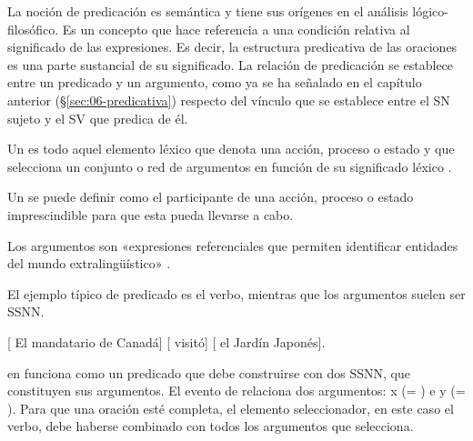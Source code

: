 La noción de predicación es semántica y tiene sus orígenes en el análisis
lógico-filosófico. Es un concepto que hace referencia a una condición relativa
al significado de las expresiones. Es decir, la estructura predicativa de las
oraciones es una parte sustancial de su significado. La relación de predicación
se establece entre un predicado y un argumento, como ya se ha señalado en el
capítulo anterior (§\ref{sec:06-predicativa}) respecto del vínculo que se
establece entre el SN sujeto y el SV que predica de él.

\begin{destacado}
Un  es todo aquel elemento léxico que denota una acción,
proceso o estado y que selecciona un conjunto o red de argumentos en función de
su significado léxico \parencite{rodriguezramalle2005}.
\end{destacado}

Un  se puede definir como el participante de una acción,
proceso o estado imprescindible para que esta pueda llevarse a cabo.

\begin{destacado}
Los argumentos son «expresiones referenciales que permiten identificar entidades
del mundo extralingüístico» \parencite[102]{ditullio2014}.
\end{destacado}

El ejemplo típico de predicado es el verbo, mientras que los argumentos suelen
ser SSNN.

\begin{exe}
  \ex\label{ex:07-visito} {}[ El mandatario de Canadá] [
      visitó] [ el Jardín Japonés].
\end{exe}

 en  funciona como un predicado que debe
construirse con dos SSNN, que constituyen sus argumentos. El evento de
 relaciona dos argumentos: x (= )
e y (= ). Para que una oración esté completa, el
elemento seleccionador, en este caso el verbo, debe haberse combinado con todos
los argumentos que selecciona.

